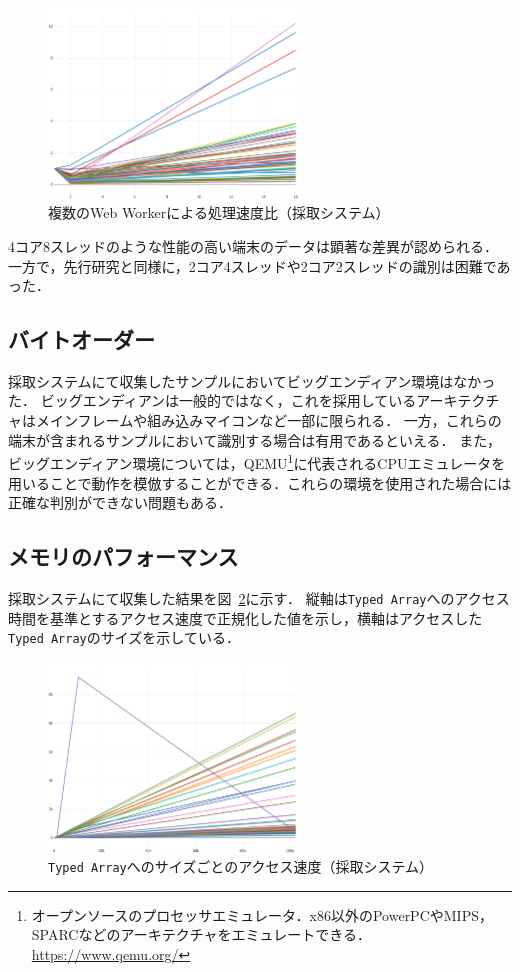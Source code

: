 \begin{figure}[H]
    \centering
    \includegraphics[width=0.6\textwidth,pagebox=cropbox]{fig/cpu_rst.pdf}
    \caption{複数のWeb Workerによる処理速度比（採取システム）}
    \label{fig-cpu_rst}
\end{figure}

4コア8スレッドのような性能の高い端末のデータは顕著な差異が認められる．
一方で，先行研究と同様に，2コア4スレッドや2コア2スレッドの識別は困難であった．


\subsection{バイトオーダー}
採取システムにて収集したサンプルにおいてビッグエンディアン環境はなかった．
ビッグエンディアンは一般的ではなく，これを採用しているアーキテクチャはメインフレームや組み込みマイコンなど一部に限られる．
一方，これらの端末が含まれるサンプルにおいて識別する場合は有用であるといえる．
また，ビッグエンディアン環境については，QEMU\footnote{オープンソースのプロセッサエミュレータ．x86以外のPowerPCやMIPS，SPARCなどのアーキテクチャをエミュレートできる．\url{https://www.qemu.org/}}に代表されるCPUエミュレータを用いることで動作を模倣することができる．これらの環境を使用された場合には正確な判別ができない問題もある．

\subsection{メモリのパフォーマンス}
採取システムにて収集した結果を図~\ref{fig-memory_rst}に示す．
縦軸は\texttt{Typed Array}へのアクセス時間を基準とするアクセス速度で正規化した値を示し，横軸はアクセスした\texttt{Typed Array}のサイズを示している．

\begin{figure}[H]
    \centering
    \includegraphics[width=0.6\textwidth,pagebox=cropbox]{fig/memory_rst.pdf}
    \caption{\texttt{Typed Array}へのサイズごとのアクセス速度（採取システム）}
    \label{fig-memory_rst}
\end{figure}

